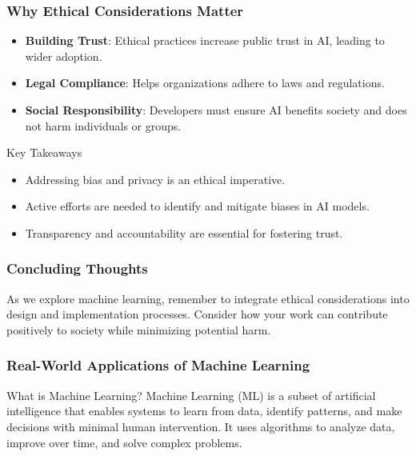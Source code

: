 \documentclass[aspectratio=169]{beamer}
\begin{document}
\begin{frame}[fragile]
    \frametitle{Why Ethical Considerations Matter}
    \begin{itemize}
        \item \textbf{Building Trust}: Ethical practices increase public trust in AI, leading to wider adoption.
        \item \textbf{Legal Compliance}: Helps organizations adhere to laws and regulations.
        \item \textbf{Social Responsibility}: Developers must ensure AI benefits society and does not harm individuals or groups.
    \end{itemize}

    \begin{block}{Key Takeaways}
        \begin{itemize}
            \item Addressing bias and privacy is an ethical imperative.
            \item Active efforts are needed to identify and mitigate biases in AI models.
            \item Transparency and accountability are essential for fostering trust.
        \end{itemize}
    \end{block}
\end{frame}

\begin{frame}[fragile]
    \frametitle{Concluding Thoughts}
    As we explore machine learning, remember to integrate ethical considerations into design and implementation processes. Consider how your work can contribute positively to society while minimizing potential harm.
\end{frame}

\begin{frame}[fragile]
    \frametitle{Real-World Applications of Machine Learning}
    \begin{block}{What is Machine Learning?}
        Machine Learning (ML) is a subset of artificial intelligence that enables systems to learn from data, identify patterns, and make decisions with minimal human intervention. It uses algorithms to analyze data, improve over time, and solve complex problems.
    \end{block}
\end{frame}
\end{document}
